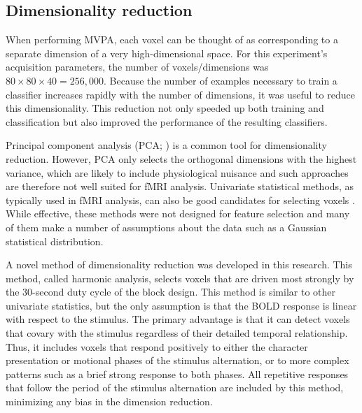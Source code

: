 \documentclass[5p,authoryear]{elsarticle}
\begin{document}
\subsection{Dimensionality reduction}
When performing MVPA, each voxel can be thought of as corresponding to a separate dimension of a very high-dimensional space.
For this experiment's acquisition parameters, the number of voxels/dimensions was $80 \times 80 \times 40 = 256,000$.
Because the number of examples necessary to train a classifier increases rapidly with the number of dimensions, it was useful to reduce this dimensionality.
This reduction not only speeded up both training and classification but also improved the performance of the resulting classifiers.

Principal component analysis (PCA; \cite{Hotelling1933}) is a common tool for dimensionality reduction.
However, PCA only selects the orthogonal dimensions with the highest variance, which are likely to include physiological nuisance and such approaches are therefore not well suited for fMRI analysis.
Univariate statistical methods, as typically used in  fMRI analysis, can also be good candidates for selecting voxels \citep{Norman2006,Pereira2009}.
While effective, these methods were not designed for feature selection and many of them make a number of assumptions about the data such as a Gaussian statistical distribution.

A novel method of dimensionality reduction was developed in this research.
This method, called harmonic analysis, selects voxels that are driven most strongly by the 30-second duty cycle of the block design.
This method is similar to other univariate statistics, but the only assumption is that the BOLD response is linear with respect to the stimulus.
The primary advantage is that it can detect voxels that covary with the stimulus regardless of their detailed temporal relationship. 
Thus, it includes voxels that respond positively to either the character presentation or motional phases of the stimulus alternation, or to more complex patterns such as a brief strong response to both phases. 
All repetitive responses that follow the period of the stimulus alternation are included by this method, minimizing any bias in the dimension reduction.
\end{document}
